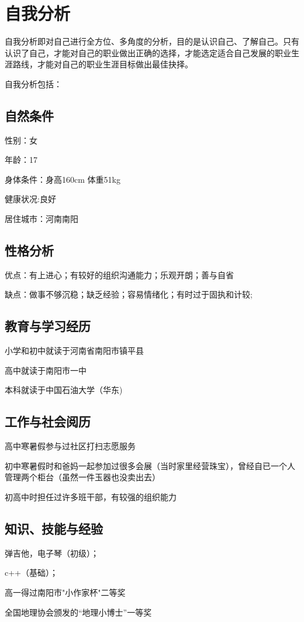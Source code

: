 \documentclass{article}
\begin{document}
\thispagestyle{empty}
\newpage
\setcounter{page}{1}
\section{自我分析}
	自我分析即对自己进行全方位、多角度的分析，目的是认识自己、了解自己。只有认识了自己，才能对自己的职业做出正确的选择，才能选定适合自己发展的职业生涯路线，才能对自己的职业生涯目标做出最佳抉择。\par
	自我分析包括：\par
\subsection{自然条件}
性别：女\par
年龄：17\par
身体条件：身高160cm 体重51kg \par
健康状况:良好\par
居住城市：河南南阳\par
\subsection{性格分析}
优点：有上进心；有较好的组织沟通能力；乐观开朗；善与自省\par
缺点：做事不够沉稳；缺乏经验；容易情绪化；有时过于固执和计较;\par
\par
\subsection{教育与学习经历}
小学和初中就读于河南省南阳市镇平县\par
高中就读于南阳市一中\par
本科就读于中国石油大学（华东)\par
\par
\subsection{工作与社会阅历}
高中寒暑假参与过社区打扫志愿服务\par
初中寒暑假时和爸妈一起参加过很多会展（当时家里经营珠宝），曾经自已一个人管理两个柜台（虽然一件玉器也没卖出去）\par
初高中时担任过许多班干部，有较强的组织能力\par
\par
\subsection{知识、技能与经验}
弹吉他，电子琴（初级）；\par
c++（基础）；\par
高一得过南阳市"小作家杯"二等奖\par
全国地理协会颁发的“地理小博士”一等奖\par
\end{document}
